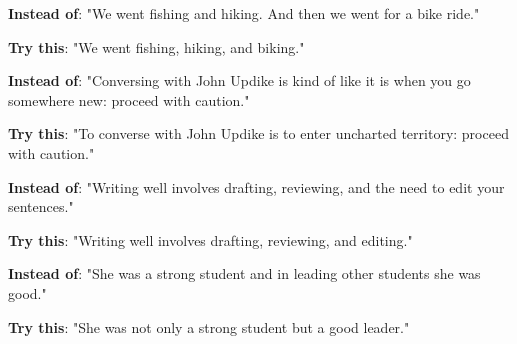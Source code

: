 \textbf{Instead of}: "We went fishing and hiking. And then we went for a bike ride."

\textbf{Try this}: "We went fishing, hiking, and biking."

\textbf{Instead of}: "Conversing with John Updike is kind of like it is when you go somewhere new:
                    proceed with caution."

	\textbf{Try this}: "To converse with John Updike is to enter uncharted territory: proceed with
                              caution."

\textbf{Instead of}:  "Writing well involves drafting, reviewing, and the need to edit your sentences."
 
	\textbf{Try this}: "Writing well involves drafting, reviewing, and editing."

\textbf{Instead of}: "She was a strong student and in leading other students she was good."

\textbf{Try this}: "She was not only a strong student but a good leader."

 

